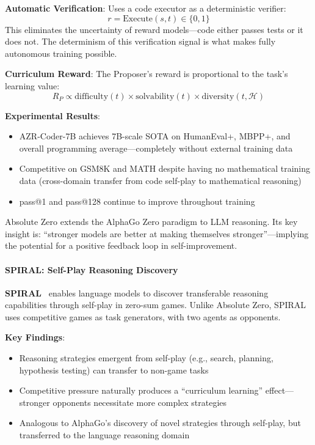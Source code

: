 \textbf{Automatic Verification}: Uses a code executor as a deterministic verifier:
\begin{equation}
r = \text{Execute}(s, t) \in \{0, 1\}
\label{eq:az-verify}
\end{equation}
This eliminates the uncertainty of reward models---code either passes tests or it does not. The determinism of this verification signal is what makes fully autonomous training possible.

\textbf{Curriculum Reward}: The Proposer's reward is proportional to the task's learning value:
\begin{equation}
R_P \propto \text{difficulty}(t) \times \text{solvability}(t) \times \text{diversity}(t, \mathcal{H})
\label{eq:az-curriculum}
\end{equation}

\textbf{Experimental Results}:
\begin{itemize}
\item AZR-Coder-7B achieves 7B-scale SOTA on HumanEval+, MBPP+, and overall programming average---completely without external training data
\item Competitive on GSM8K and MATH despite having no mathematical training data (cross-domain transfer from code self-play to mathematical reasoning)
\item pass@1 and pass@128 continue to improve throughout training
\end{itemize}

Absolute Zero extends the AlphaGo Zero paradigm to LLM reasoning. Its key insight is: ``stronger models are better at making themselves stronger''---implying the potential for a positive feedback loop in self-improvement.

\paragraph{SPIRAL: Self-Play Reasoning Discovery}

\textbf{SPIRAL}~\citep{spiral2024} enables language models to discover transferable reasoning capabilities through self-play in zero-sum games. Unlike Absolute Zero, SPIRAL uses competitive games as task generators, with two agents as opponents.

\textbf{Key Findings}:
\begin{itemize}
\item Reasoning strategies emergent from self-play (e.g., search, planning, hypothesis testing) can transfer to non-game tasks
\item Competitive pressure naturally produces a ``curriculum learning'' effect---stronger opponents necessitate more complex strategies
\item Analogous to AlphaGo's discovery of novel strategies through self-play, but transferred to the language reasoning domain
\end{itemize}

